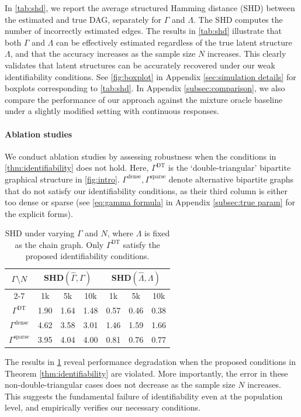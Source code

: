 \documentclass[10pt]{article} %
\def\hat{\widehat}
\begin{document}
In \cref{tab:shd}, we report the average structured Hamming distance (SHD) between the estimated and true DAG, separately for $\Gamma$ and $\Lambda$. The SHD computes the number of incorrectly estimated edges. %
The results in \cref{tab:shd} illustrate that both $\Gamma$ and $\Lambda$ can be effectively estimated regardless of the true latent structure $\Lambda$, and that the accuracy increases as the sample size $N$ increases. This clearly validates that latent structures can be accurately recovered under our weak identifiability conditions. See \cref{fig:boxplot} in Appendix \ref{sec:simulation details} for boxplots corresponding to \cref{tab:shd}. {In Appendix \ref{subsec:comparison}, we also compare the  performance of our approach against the mixture oracle baseline \citep{kivva2021learning} under a slightly modified setting with continuous responses.}

\paragraph{Ablation studies} We conduct ablation studies by assessing robustness when the conditions in \cref{thm:identifiability} does not hold. Here, $\Gamma^{\text{DT}}$ is the `double-triangular' bipartite graphical structure in \cref{fig:intro}. $\Gamma^{\text{dense}}, \Gamma^{\text{sparse}}$ denote alternative bipartite graphs that do not satisfy our identifiability conditions, as their third column is either too dense or sparse (see \eqref{eq:gamma formula} in Appendix \ref{subsec:true param} for the explicit forms).


\begin{table}[h!]
    \centering
    \begin{tabular}{ccccccc}
    \toprule
        \multirow{2}{*}{$\Gamma \setminus N$} &
      \multicolumn{3}{c}{SHD$(\hat{\Gamma},\Gamma)$} & \multicolumn{3}{c}{SHD$(\hat{\Lambda},\Lambda)$} \\
      \cmidrule{2-7}
      & 1k & 5k & 10k & 1k & 5k & 10k \\
    \midrule
    $\Gamma^{\text{DT}}$ & 1.90 & 1.64 & 1.48 & 0.57 & 0.46 & 0.38 \\
    $\Gamma^{\text{dense}}$	& 4.62 & 3.58 & 3.01 & 1.46 & 1.59 & 1.66 \\
    $\Gamma^{\text{sparse}}$ & 3.95 & 4.04 & 4.00 & 0.81 & 0.76 & 0.77 \\
    \bottomrule
%
    \end{tabular}
    \caption{SHD under varying $\Gamma$ and $N$, where $\Lambda$ is fixed as the chain graph. Only $\Gamma^{\text{DT}}$ satisfy the proposed identifiability conditions.}
    \label{tab:robust}
\end{table}
The results in \cref{tab:robust} reveal performance degradation when the proposed conditions in Theorem \ref{thm:identifiability} are violated. More importantly, the error in these non-double-triangular cases does not decrease as the sample size $N$ increases. This suggests the fundamental failure of identifiability even at the population level, and empirically verifies our necessary conditions. 
\end{document}
